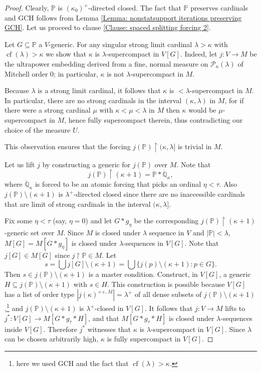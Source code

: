 \documentclass[11pt]{amsart}
\renewcommand{\restriction}{\mathbin\upharpoonright}    %
\theoremstyle{definition}
\newcounter{condition}
\theoremstyle{remark}
\newcommand\<{{<}}
\def\s{\subseteq}
\DeclareMathOperator{\cf}{cf}
\newcommand{\po}{\mathbb{P}}
\newcommand{\qo}{\mathbb{Q}}
\begin{document}
    \begin{proof}
        Clearly, $\po$ is $(\kappa_0)^+$-directed closed. The fact that $\po$ preserves cardinals and GCH follows from Lemma \ref{Lemma: nonstatsupport iterations preserving GCH}. Let us proceed to clause \eqref{Clause: spaced splitting forcing 2}. 
        
        Let $G\s \mathbb{P}$ a $V$-generic. 
        For any singular strong limit cardinal $\lambda > \kappa$ with $\cf(\lambda)>\kappa$ we show that $\kappa$ is $\lambda$-supercompact in $V[G]$. Indeed, let $j \colon V \to M$ be the ultrapower embedding derived from a fine, normal measure on $\mathcal{P}_\kappa(\lambda)$ of Mitchell order $0$; in particular, $\kappa$ is not $\lambda$-supercompact in $M$.

        Because $\lambda$ is a strong limit cardinal, it follows that $\kappa$ is $<\lambda$-supercompact in $M$. In particular, there are no strong cardinals in the interval $(\kappa,\lambda)$ in $M$, for if there were a strong cardinal $\mu$ with $\kappa < \mu < \lambda$ in $M$ then $\kappa$ would be $\mu$-supercompact in $M$,  hence fully supercompact therein, thus contradicting our choice of the measure $U$. %

        This observation ensures that the forcing $j(\po)\restriction (\kappa, \lambda]$ is trivial in $M$. 
        
        Let us lift $j$ by constructing a generic for $j(\po)$ over $M$. 
        Note that $$j(\po)\restriction (\kappa+1) = \po \ast \dot{\qo}_\kappa,$$ where $\dot{\qo}_\kappa$ is forced to be an atomic forcing that picks an ordinal $\eta<\tau$. Also $j(\po)\setminus (\kappa+1)$ is $\lambda^{+}$-directed closed since there are no inaccessible cardinals that are limit of strong cardinals in the interval $(\kappa, \lambda]$.

        
        Fix some $\eta<\tau$ (say, $\eta = 0$) 
        and let $G*g_\eta$ be the corresponding $j(\po)\restriction (\kappa+1)$-generic set over $M$. Since $M$ is closed under $\lambda$ sequence in $V$ and $|\po|< \lambda$, $M[G] = M[G\ast g_\eta]$ is closed under $\lambda$-sequences in $V[G]$. Note that $j[G]\in M[G]$ since $j\restriction \po \in M$. Let 
        $$s = \bigcup j[G]\setminus (\kappa+1) = \bigcup\{ j(p)\setminus (\kappa+1) \colon p\in G \}. $$
        Then $s\in j(\po)\setminus (\kappa+1)$ is a master condition. Construct, in $V[G]$, a generic $H\subseteq j(\po)\setminus (\kappa+1)$ with $s\in H$. This construction is possible because $V[G]$ has a list of order type $|j(\kappa)^{++, M}| = \lambda^{+}$ of all dense subsets of $j(\po)\setminus (\kappa+1)$,\footnote{here we used GCH and the fact that $\cf(\lambda)>\kappa$.} and $j(\po)\setminus (\kappa+1)$ is $\lambda^+$-closed in $V[G]$. It follows that $j\colon V\to M$ lifts to $j^*\colon V[G]\to M[G\ast g_\tau \ast H]$, and that  $M[G\ast g_\tau \ast H]$ is closed under $\lambda$-sequences inside $V[G]$. Therefore $j^*$ witnesses that $\kappa$ is $\lambda$-supercompact in $V[G]$. Since $\lambda$ can be chosen arbitrarily high, $\kappa$ is fully supercompact in $V[G]$.


\end{proof}
\end{document}
